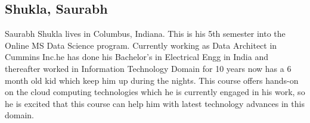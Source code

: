 
\subsection{Shukla, Saurabh}

Saurabh Shukla lives in Columbus, Indiana. This is his 5th semester
into the Online MS Data Science program. Currently working as Data
Architect in Cummins Inc.he has done his Bachelor's in Electrical Engg
in India and thereafter worked in Information Technology Domain for 10
years now has a 6 month old kid which keep him up during the nights.
This course offers hands-on on the cloud computing technologies which
he is currently engaged in his work, so he is excited that this course
can help him with latest technology advances in this domain.
